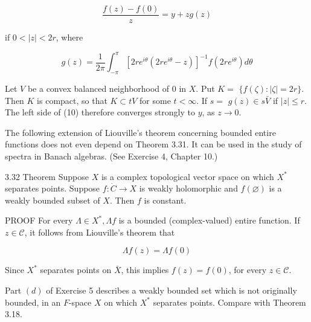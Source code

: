 \documentclass[10pt]{article}
\begin{document}
$$
\frac{f(z)-f(0)}{z}=y+z g(z)
$$

if $0<|z|<2 r$, where

$$
g(z)=\frac{1}{2 \pi} \int_{-\pi}^{\pi}\left[2 r e^{i \theta}\left(2 r e^{i \theta}-z\right)\right]^{-1} f\left(2 r e^{i \theta}\right) d \theta
$$

Let $V$ be a convex balanced neighborhood of 0 in $X$. Put $K=$ $\{f(\zeta):|\zeta|=2 r\}$. Then $K$ is compact, so that $K \subset t V$ for some $t<\infty$. If $s=$
$g(z) \in s \bar{V}$ if $|z| \leq r$. The left side of (10) therefore converges strongly to $y$, as $z \rightarrow 0$.

The following extension of Liouville's theorem concerning bounded entire functions does not even depend on Theorem 3.31. It can be used in the study of spectra in Banach algebras. (See Exercise 4, Chapter 10.)

3.32 Theorem Suppose $X$ is a complex topological vector space on which $X^{*}$ separates points. Suppose $f: \dot{C} \rightarrow X$ is weakly holomorphic and $f(\varnothing)$ is a weakly bounded subset of $X$. Then $f$ is constant.

PROOF For every $\Lambda \in X^{*}, \Lambda f$ is a bounded (complex-valued) entire function. If $z \in \mathscr{C}$, it follows from Liouville's theorem that

$$
\Lambda f(z)=\Lambda f(0)
$$

Since $X^{*}$ separates points on $\bar{X}$, this implies $f(z)=f(0)$, for every $z \in \mathscr{C}$.

Part $(d)$ of Exercise 5 describes a weakly bounded set which is not originally bounded, in an $F$-space $X$ on which $X^{*}$ separates points. Compare with Theorem 3.18.
\end{document}
